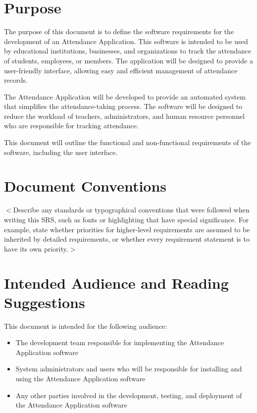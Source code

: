 \documentclass{scrreprt}
\begin{document}
\section{Purpose}
The purpose of this document is to define the software requirements for the development of an Attendance Application. This software is intended to be used by educational institutions, businesses, and organizations to track the attendance of students, employees, or members. The application will be designed to provide a user-friendly interface, allowing easy and efficient management of attendance records.

The Attendance Application will be developed to provide an automated system that simplifies the attendance-taking process. The software will be designed to reduce the workload of teachers, administrators, and human resource personnel who are responsible for tracking attendance.

This document will outline the functional and non-functional requirements of the software, including the user interface.

\section{Document Conventions}
$<$Describe any standards or typographical conventions that were followed when 
writing this SRS, such as fonts or highlighting that have special significance.  
For example, state whether priorities  for higher-level requirements are assumed 
to be inherited by detailed requirements, or whether every requirement statement 
is to have its own priority.$>$

\section{Intended Audience and Reading Suggestions}
    \vspace*{-4pt}
This document is intended for the following audience:
    \vspace*{-7pt}
\begin{itemize}
    \item The development team responsible for implementing the Attendance Application software
    \vspace*{-7pt}
    \item System administrators and users who will be responsible for installing and using the Attendance Application software
    \vspace*{-7pt}
    \item Any other parties involved in the development, testing, and deployment of the Attendance Application software
\end{itemize}
\end{document}
